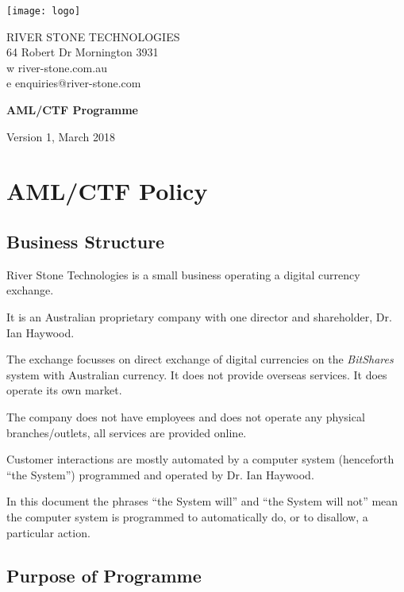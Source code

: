 \documentclass[12pt]{report}
\begin{document}
\texttt{[image: logo]} \parbox[b]{5in}{\sffamily RIVER STONE TECHNOLOGIES \\
  64 Robert Dr Mornington 3931\\ w river-stone.com.au \\ e enquiries@river-stone.com }

\rmfamily
\vspace{1.5in}

\begin{center}
  {\Huge \bfseries AML/CTF Programme}
  \vspace{1in}

  {\large Version 1, March 2018}
 \end{center}
\setcounter{page}{1}                    %

 
\renewcommand{\thechapter}{\Alph{chapter}}
\def\labelsection{\thechapter \thesection}

\chapter{AML/CTF Policy}

\section{Business Structure}

River Stone Technologies is  a small business operating a digital currency exchange.

It is an Australian proprietary company with one director and shareholder,
Dr. Ian Haywood.

The exchange focusses on direct exchange of digital currencies on
the \emph{BitShares} system with Australian currency. It does
not provide overseas services. It does operate its own market.

The company does not have employees and does not operate any physical
branches/outlets, all services are provided online.

Customer interactions are mostly automated by a computer system
(henceforth ``the System'') programmed and operated by Dr. Ian Haywood.

In this document the phrases ``the System will'' and ``the System will not'' mean the
computer system is programmed to automatically do, or to disallow, a particular action.

\section{Purpose of Programme}
\end{document}
